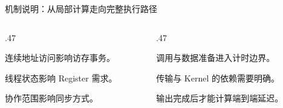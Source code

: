 \begin{frame}{机制说明：从局部计算走向完整执行路径}
\begin{columns}[T,onlytextwidth]
\begin{column}{.47\textwidth}
\begin{denseitems}
\item 连续地址访问影响访存事务。
\item 线程状态影响 Register 需求。
\item 协作范围影响同步方式。
\end{denseitems}
\vspace{3mm}
\end{column}
\begin{column}{.47\textwidth}
\begin{denseitems}
\item 调用与数据准备进入计时边界。
\item 传输与 Kernel 的依赖需要明确。
\item 输出完成后才能计算端到端延迟。
\end{denseitems}
\vspace{3mm}
\end{column}
\end{columns}
\vspace{3mm}
\end{frame}

